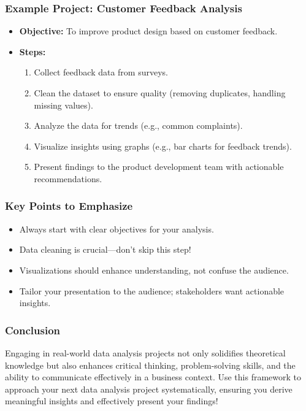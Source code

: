 \documentclass[aspectratio=169]{beamer}
\begin{document}
\begin{frame}
    \frametitle{Example Project: Customer Feedback Analysis}
    \begin{itemize}
        \item \textbf{Objective:} To improve product design based on customer feedback.
        \item \textbf{Steps:}
            \begin{enumerate}
                \item Collect feedback data from surveys.
                \item Clean the dataset to ensure quality (removing duplicates, handling missing values).
                \item Analyze the data for trends (e.g., common complaints).
                \item Visualize insights using graphs (e.g., bar charts for feedback trends).
                \item Present findings to the product development team with actionable recommendations.
            \end{enumerate}
    \end{itemize}
\end{frame}

\begin{frame}
    \frametitle{Key Points to Emphasize}
    \begin{itemize}
        \item Always start with clear objectives for your analysis.
        \item Data cleaning is crucial—don’t skip this step!
        \item Visualizations should enhance understanding, not confuse the audience.
        \item Tailor your presentation to the audience; stakeholders want actionable insights.
    \end{itemize}
\end{frame}

\begin{frame}
    \frametitle{Conclusion}
    Engaging in real-world data analysis projects not only solidifies theoretical knowledge but also enhances critical thinking, problem-solving skills, and the ability to communicate effectively in a business context. Use this framework to approach your next data analysis project systematically, ensuring you derive meaningful insights and effectively present your findings!
\end{frame}
\end{document}
